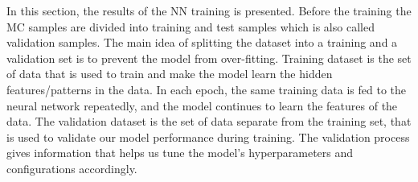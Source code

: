 In this section, the results of the NN training is presented. Before the training the MC samples are divided into training and test samples which is also called validation samples. The main idea of splitting the dataset into a training and a validation set is to prevent the model from over-fitting. Training dataset is the set of data that is used to train and make the model learn the hidden features/patterns in the data. In each epoch, the same training data is fed to the neural network repeatedly, and the model continues to learn the features of the data. The validation dataset is the set of data separate from the training set, that is used to validate our model performance during training. The validation process gives information that helps us tune the model's hyperparameters and configurations accordingly.


